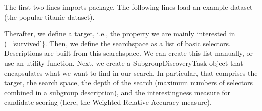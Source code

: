 \documentclass[letterpaper,10pt,english]{sphinxmanual}
\begin{document}
{
\begin{sphinxVerbatim}[commandchars=\\\{\}]
\llap{\color{nbsphinxin}[1]:\,\hspace{\fboxrule}\hspace{\fboxsep}}   

   
  

    
   \PYG{p}{[}\PYG{p}{]}
   
  

\end{sphinxVerbatim}
}

The first two lines imports  package. The following lines load an example dataset (the popular titanic dataset).

Therafter, we define a target, i.e., the property we are mainly interested in (\_‘survived’\}. Then, we define the searchspace as a list of basic selectors. Descriptions are built from this searchspace. We can create this list manually, or use an utility function. Next, we create a SubgroupDiscoveryTask object that encapsulates what we want to find in our search. In particular, that comprises the target, the search space, the depth of the search (maximum numbers of selectors combined in a
subgroup description), and the interestingness measure for candidate scoring (here, the Weighted Relative Accuracy measure).
\end{document}
